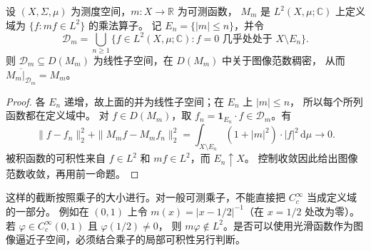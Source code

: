 \begin{proposition}[乘法算子的截断定义子空间]
\label{b1:prop:29-multiplication-core}
设 \((X,\Sigma,\mu)\) 为测度空间，\(m:X\to\mathbb R\) 为可测函数，
\(M_m\) 是 \(L^2(X,\mu;\mathbb C)\) 上定义域为 \(\{f:mf\in L^2\}\) 的乘法算子。
记 \(E_n=\{|m|\leq n\}\)，并令
\[
 \mathcal D_m=\bigcup_{n\geq1}
 \{f\in L^2(X,\mu;\mathbb C):f=0\text{ 几乎处处于 }X\setminus E_n\}.
\]
则 \(\mathcal D_m\subseteq D(M_m)\) 为线性子空间，在 \(D(M_m)\) 中关于图像范数稠密，
从而 \(\overline{M_m|_{\mathcal D_m}}=M_m\)。
\end{proposition}
\begin{proof}
各 \(E_n\) 递增，故上面的并为线性子空间；在 \(E_n\) 上 \(|m|\leq n\)，
所以每个所列函数都在定义域中。
对 \(f\in D(M_m)\)，取 \(f_n=\mathbf1_{E_n}\cdot f\in\mathcal D_m\)。有
\[
 \|f-f_n\|_2^2+\|M_mf-M_mf_n\|_2^2
 =\int_{X\setminus E_n}(1+|m|^2)\cdot|f|^2\,\mathrm d\mu
 \longrightarrow0.
\]
被积函数的可积性来自 \(f\in L^2\) 和 \(mf\in L^2\)，而 \(E_n\uparrow X\)。
控制收敛因此给出图像范数收敛，再用前一命题。
\end{proof}

这样的截断按照乘子的大小进行。对一般可测乘子，不能直接把 \(C_c^\infty\) 当成定义域的一部分。
例如在 \((0,1)\) 上令 \(m(x)=|x-1/2|^{-1}\)（在 \(x=1/2\) 处改为零）。
若 \(\varphi\in C_c^\infty(0,1)\) 且 \(\varphi(1/2)\ne0\)，
则 \(m\varphi\notin L^2\)。是否可以使用光滑函数作为图像逼近子空间，必须结合乘子的局部可积性另行判断。

